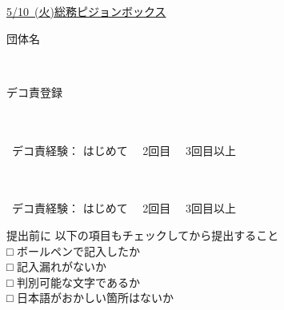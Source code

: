 \documentclass[paper=b5j, fleqn, jafontsize=9pt, jafontscale=1, head_space=25.5mm, foot_space=15mm, fore-edge=9.5mm, gutter=9.5mm, hanging_punctuation, baselineskip=7mm]{jlreq}
\begin{document}
\pagestyle{normals}
\begin{center}
    {\selectsize{15pt}{15pt}}
    \vskip5mm
\end{center}
\uline{{\selectsize{10pt}{10pt}\uline{5/10~({\selectsize{9pt}{9pt}火})}}}\uline{総務ピジョンボックス}\\

\begin{question}{団体名}
\end{question}
\kasen[width=100mm]{}\\

\begin{question}{デコ責登録}
\end{question}
\vspace{-10mm}
\begin{enumsquare}
    \item {}\\\\\indent ~デコ責経験： はじめて　 2回目　 3回目以上
    \item {}\\\\\indent ~デコ責経験： はじめて　 2回目　 3回目以上
\end{enumsquare}
\vfill
\begin{framebox-simple}{提出前に}
    \noindent {}以下の項目もチェックしてから提出すること\\
    □ ボールペンで記入したか\\
    □ 記入漏れがないか\\
    □ 判別可能な文字であるか\\
    □ 日本語がおかしい箇所はないか
\end{framebox-simple}
\end{document}
